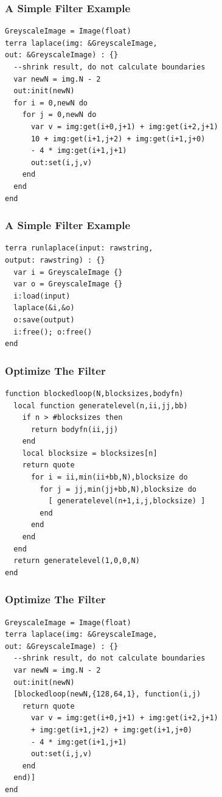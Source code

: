 \documentclass{beamer}
\begin{document}
\begin{frame}[fragile]
  \frametitle{A Simple Filter Example}
  \begin{lstlisting}
GreyscaleImage = Image(float)
terra laplace(img: &GreyscaleImage,
out: &GreyscaleImage) : {}
  --shrink result, do not calculate boundaries
  var newN = img.N - 2
  out:init(newN)
  for i = 0,newN do
    for j = 0,newN do
      var v = img:get(i+0,j+1) + img:get(i+2,j+1)
      10 + img:get(i+1,j+2) + img:get(i+1,j+0)
      - 4 * img:get(i+1,j+1)
      out:set(i,j,v)
    end
  end
end
  \end{lstlisting}
\end{frame}

\begin{frame}[fragile]
	\frametitle{A Simple Filter Example}
  \begin{lstlisting}
terra runlaplace(input: rawstring,
output: rawstring) : {}
  var i = GreyscaleImage {}
  var o = GreyscaleImage {}
  i:load(input)
  laplace(&i,&o)
  o:save(output)
  i:free(); o:free()
end
  \end{lstlisting}
\end{frame}

\begin{frame}[fragile]
	\frametitle{Optimize The Filter}
  \begin{lstlisting}
function blockedloop(N,blocksizes,bodyfn)
  local function generatelevel(n,ii,jj,bb)
    if n > #blocksizes then
      return bodyfn(ii,jj)
    end
    local blocksize = blocksizes[n]
    return quote
      for i = ii,min(ii+bb,N),blocksize do
        for j = jj,min(jj+bb,N),blocksize do
          [ generatelevel(n+1,i,j,blocksize) ]
        end
      end
    end
  end
  return generatelevel(1,0,0,N)
end
  \end{lstlisting}
\end{frame}

\begin{frame}[fragile]
	\frametitle{Optimize The Filter}
  \begin{lstlisting}
GreyscaleImage = Image(float)
terra laplace(img: &GreyscaleImage,
out: &GreyscaleImage) : {}
  --shrink result, do not calculate boundaries
  var newN = img.N - 2
  out:init(newN)
  [blockedloop(newN,{128,64,1}, function(i,j)
    return quote
      var v = img:get(i+0,j+1) + img:get(i+2,j+1)
      + img:get(i+1,j+2) + img:get(i+1,j+0)
      - 4 * img:get(i+1,j+1)
      out:set(i,j,v)
    end
  end)]
end
  \end{lstlisting}
\end{frame}
\end{document}
